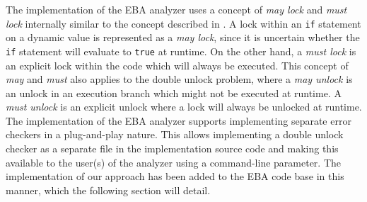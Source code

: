 \noindent The implementation of the EBA analyzer uses a concept of \textit{may lock} and \textit{must lock} internally similar to the concept described in \cite{Godefroid}. A lock within an \texttt{if} statement on a dynamic value is represented as a \textit{may lock}, since it is uncertain whether the \texttt{if} statement will evaluate to \texttt{true} at runtime. On the other hand, a \textit{must lock} is an explicit lock within the code which will always be executed. This concept of \textit{may} and \textit{must} also applies to the double unlock problem, where a \textit{may unlock} is an unlock in an execution branch which might not be executed at runtime. A \textit{must unlock} is an explicit unlock where a lock will always be unlocked at runtime. \\

\noindent The implementation of the EBA analyzer supports implementing separate error checkers in a plug-and-play nature. This allows implementing a double unlock checker as a separate file in the implementation source code and making this available to the user(s) of the analyzer using a command-line parameter. The implementation of our approach has been added to the EBA code base in this manner, which the following section will detail.  